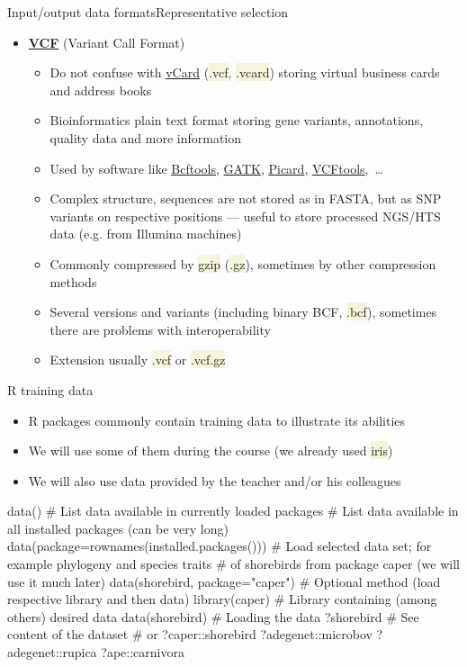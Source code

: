 \documentclass[compress, xelatex, 11pt, xcolor=svgnames, aspectratio=169, url={hyphens, lowtilde}]{beamer}
\renewcommand{\texttt}[1]{\colorbox{Beige}{{\ttfamily #1}}}
\begin{document}
\begin{frame}[allowframebreaks]{Input/output data formats}{Representative selection}
\begin{itemize}
		\item \href{https://en.wikipedia.org/wiki/Variant_Call_Format}{\textbf{VCF}} (Variant Call Format)
		\begin{itemize}
			\item Do not confuse with \href{https://en.wikipedia.org/wiki/VCard}{vCard} (\texttt{*.vcf}, \texttt{*.vcard}) storing virtual business cards and address books
			\item Bioinformatics plain text format storing gene variants, annotations, quality data and more information
			\item Used by software like \href{https://samtools.github.io/bcftools/}{Bcftools}, \href{https://gatk.broadinstitute.org/hc/en-us}{GATK}, \href{https://broadinstitute.github.io/picard/}{Picard}, \href{https://vcftools.github.io/}{VCFtools},~\ldots
			\item Complex structure, sequences are not stored as in FASTA, but as SNP variants on respective positions --- useful to store processed NGS/HTS data (e.g. from Illumina machines)
			\item Commonly compressed by \texttt{gzip} (\texttt{*.gz}), sometimes by other compression methods
			\item Several versions and variants (including binary BCF, \texttt{*.bcf}), sometimes there are problems with interoperability
			\item Extension usually \texttt{*.vcf} or \texttt{*.vcf.gz}
		\end{itemize}
	\end{itemize}
\end{frame}

\begin{frame}[fragile]{R training data}
	\begin{itemize}
		\item R packages commonly contain training data to illustrate its abilities
		\item We will use some of them during the course (we already used \texttt{iris})
		\item We will also use data provided by the teacher and/or his colleagues
	\end{itemize}
	\begin{spluscode}
    data() # List data available in currently loaded packages
    # List data available in all installed packages (can be very long)
    data(package=rownames(installed.packages()))
    # Load selected data set; for example phylogeny and species traits
    # of shorebirds from package caper (we will use it much later)
    data(shorebird, package="caper")
    # Optional method (load respective library and then data)
    library(caper) # Library containing (among others) desired data
    data(shorebird) # Loading the data
    ?shorebird # See content of the dataset # or ?caper::shorebird
    ?adegenet::microbov
    ?adegenet::rupica
    ?ape::carnivora
	\end{spluscode}
\end{frame}
\end{document}

